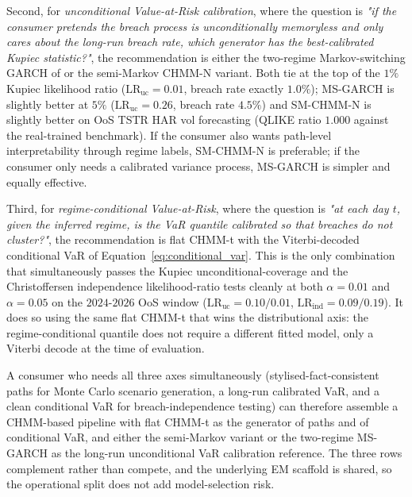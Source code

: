 Second, for \emph{unconditional Value-at-Risk calibration}, where the question is \emph{"if the consumer pretends the breach process is unconditionally memoryless and only cares about the long-run breach rate, which generator has the best-calibrated Kupiec statistic?"}, the recommendation is either the two-regime Markov-switching GARCH of \citet{haas2004new} or the semi-Markov CHMM-N variant.
Both tie at the top of the $1\%$ Kupiec likelihood ratio ($\text{LR}_{\text{uc}} = 0.01$, breach rate exactly $1.0\%$); MS-GARCH is slightly better at $5\%$ ($\text{LR}_{\text{uc}} = 0.26$, breach rate $4.5\%$) and SM-CHMM-N is slightly better on OoS TSTR HAR vol forecasting (QLIKE ratio $1.000$ against the real-trained benchmark).
If the consumer also wants path-level interpretability through regime labels, SM-CHMM-N is preferable; if the consumer only needs a calibrated variance process, MS-GARCH is simpler and equally effective.

Third, for \emph{regime-conditional Value-at-Risk}, where the question is \emph{"at each day $t$, given the inferred regime, is the VaR quantile calibrated so that breaches do not cluster?"}, the recommendation is flat CHMM-t with the Viterbi-decoded conditional VaR of Equation~\eqref{eq:conditional_var}.
This is the only combination that simultaneously passes the Kupiec unconditional-coverage and the Christoffersen independence likelihood-ratio tests cleanly at both $\alpha = 0.01$ and $\alpha = 0.05$ on the $2024$-$2026$ OoS window ($\text{LR}_{\text{uc}} = 0.10 / 0.01$, $\text{LR}_{\text{ind}} = 0.09 / 0.19$).
It does so using the same flat CHMM-t that wins the distributional axis: the regime-conditional quantile does not require a different fitted model, only a Viterbi decode at the time of evaluation.

A consumer who needs all three axes simultaneously (stylised-fact-consistent paths for Monte Carlo scenario generation, a long-run calibrated VaR, and a clean conditional VaR for breach-independence testing) can therefore assemble a CHMM-based pipeline with flat CHMM-t as the generator of paths and of conditional VaR, and either the semi-Markov variant or the two-regime MS-GARCH as the long-run unconditional VaR calibration reference.
The three rows complement rather than compete, and the underlying EM scaffold is shared, so the operational split does not add model-selection risk.

